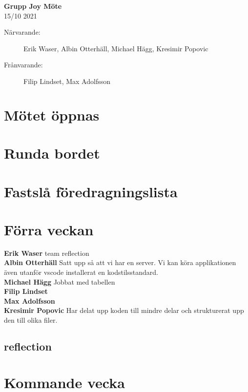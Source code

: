 \documentclass[9pt]{article}
\newcommand{\Waser}{Erik Waser\xspace}
\newcommand{\Slaget}{Albin Otterhäll\xspace}
\newcommand{\Max}{Max Adolfsson\xspace}
\newcommand{\Kim}{Michael Hägg\xspace}
\newcommand{\Algen}{Filip Lindset\xspace}
\newcommand{\Kres}{Kresimir Popovic\xspace}
\newcommand{\datum}{15/10 2021} %
\begin{document}
\begin{center}
    \Large{\textbf{Grupp Joy Möte}}\\
    \normalsize
    \datum \\ %
\end{center}

\begin{description} %
  \item [Närvarande:] \Waser, \Slaget, \Kim, \Kres
  \item [Frånvarande:]  \Algen, \Max

\end{description}

\section{Mötet öppnas}

\section{Runda bordet}

\section{Fastslå föredragningslista}

\section{Förra veckan}
\textbf{\Waser} team reflection \\
\textbf{\Slaget} Satt upp så att vi har en server. Vi kan köra applikationen även utanför vscode installerat en kodstilsstandard.\\
\textbf{\Kim} Jobbat med tabellen\\
\textbf{\Algen}\\
\textbf{\Max}\\
\textbf{\Kres} Har delat upp koden till mindre delar och strukturerat upp den till olika filer.\\

\subsection{reflection}

\section{Kommande vecka}
\end{document}
